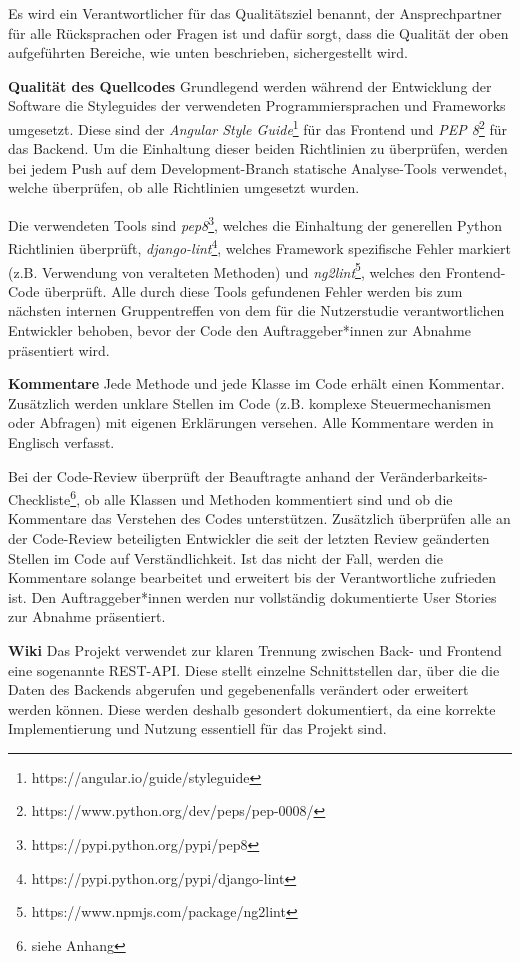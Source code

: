 \documentclass[accentcolor=tud0b,12pt,paper=a4]{tudreport}
\begin{document}
Es wird ein Verantwortlicher für das Qualitätsziel benannt, der Ansprechpartner für alle Rücksprachen oder Fragen ist und dafür sorgt, dass die Qualität der oben aufgeführten Bereiche, wie unten beschrieben, sichergestellt wird.

\textbf{Qualität des Quellcodes}
Grundlegend werden während der Entwicklung der Software die Styleguides der verwendeten Programmiersprachen und Frameworks umgesetzt. Diese sind der \emph{Angular Style Guide}\footnote{https://angular.io/guide/styleguide} für das Frontend und \emph{PEP 8}\footnote{https://www.python.org/dev/peps/pep-0008/} für das Backend. Um die Einhaltung dieser beiden Richtlinien zu überprüfen, werden bei jedem Push auf dem Development-Branch statische Analyse-Tools verwendet, welche überprüfen, ob alle Richtlinien umgesetzt wurden.

Die verwendeten Tools sind \emph{pep8}\footnote{https://pypi.python.org/pypi/pep8}, welches die Einhaltung der generellen Python Richtlinien überprüft, \emph{django-lint}\footnote{https://pypi.python.org/pypi/django-lint}, welches Framework spezifische Fehler markiert (z.B. Verwendung von veralteten Methoden) und \emph{ng2lint}\footnote{https://www.npmjs.com/package/ng2lint}, welches den Frontend-Code überprüft. Alle durch diese Tools gefundenen Fehler werden bis zum nächsten internen Gruppentreffen von dem für die Nutzerstudie verantwortlichen Entwickler behoben, bevor der Code den Auftraggeber*innen zur Abnahme präsentiert wird.

\textbf{Kommentare}
Jede Methode und jede Klasse im Code erhält einen Kommentar. Zusätzlich werden unklare Stellen im Code (z.B. komplexe Steuermechanismen oder Abfragen) mit eigenen Erklärungen versehen. Alle Kommentare werden in Englisch verfasst.

Bei der Code-Review überprüft der Beauftragte anhand der Veränderbarkeits-Checkliste\footnote{siehe Anhang}, ob alle Klassen und Methoden kommentiert sind und ob die Kommentare das Verstehen des Codes unterstützen. Zusätzlich überprüfen alle an der Code-Review beteiligten Entwickler die seit der letzten Review geänderten Stellen im Code auf Verständlichkeit. Ist das nicht der Fall, werden die Kommentare solange bearbeitet und erweitert bis der Verantwortliche zufrieden ist. Den Auftraggeber*innen werden nur vollständig dokumentierte User Stories zur Abnahme präsentiert.

\textbf{Wiki}
Das Projekt verwendet zur klaren Trennung zwischen Back- und Frontend eine sogenannte REST-API. Diese stellt einzelne Schnittstellen dar, über die die Daten des Backends abgerufen und gegebenenfalls verändert oder erweitert werden können. Diese werden deshalb gesondert dokumentiert, da eine korrekte Implementierung und Nutzung essentiell für das Projekt sind. 
\end{document}
